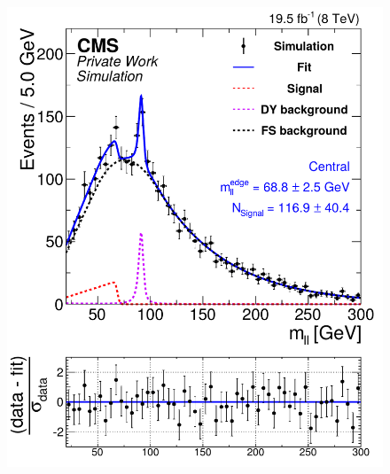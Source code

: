 \begin{figure}[hbp]
  \centering
  \begin{minipage}[t]{0.49\textwidth}
    \includegraphics[width=\textwidth]{plots/results/fit/mcFits/fit2012_ETHTriangle_SignalInclusive_Combined_Full2012_ETHTriangle_MC_SignalInjected_edge_400_150_80_Central.pdf}
  \end{minipage}
  \begin{minipage}[t]{0.49\textwidth}

\end{minipage}
\end{figure}

